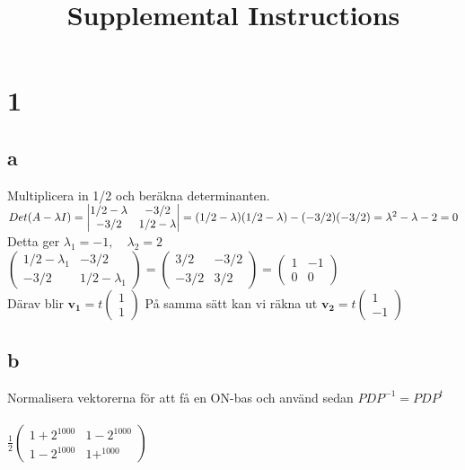 \documentclass{article}
\title{Supplemental Instructions}
\date{
     }
\begin{document}
\maketitle


\section*{1}
\subsection*{a}
Multiplicera in 1/2 och beräkna determinanten. 
$
\\
Det(A-\lambda I) = 
\begin{vmatrix}
	1/2-\lambda & -3/2 \\
	-3/2 & 1/2-\lambda 
\end{vmatrix} 
=
(1/2-\lambda)(1/2-\lambda) - (-3/2)(-3/2)
=
\lambda^2 - \lambda - 2 = 0
$
\\
Detta ger $\lambda_1 = -1, \quad \lambda_2 = 2$ \\
$
\begin{pmatrix}
	1/2-\lambda_1 & -3/2 \\
	-3/2 & 1/2-\lambda_1 
\end{pmatrix} 
=
\begin{pmatrix}
	3/2 & -3/2 \\
	-3/2 & 3/2 
\end{pmatrix} 
=
\begin{pmatrix}
	1 & -1 \\
	0 & 0 
\end{pmatrix} 
$
\\
Därav blir 
$\mathbf{v_1} = t 
\begin{pmatrix}
	1  \\
	1
\end{pmatrix} 
$
På samma sätt kan vi räkna ut 
$\mathbf{v_2} = t 
\begin{pmatrix}
	1  \\
	-1
\end{pmatrix} 
$
\subsection*{b}
Normalisera vektorerna för att få en ON-bas och använd sedan $PDP^{-1} = PDP^t$ \\
\\
$
\frac{1}{2}
\begin{pmatrix}
	1+2^{1000} & 1-2^{1000} \\
	1-2^{1000} & 1+^{1000}
\end{pmatrix}
$
\end{document}
